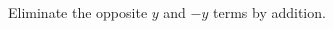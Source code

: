 
\question Eliminate the opposite \(y\) and \(-y\) terms by addition.\hs
\begin{multicols}{2} %
\end{multicols}